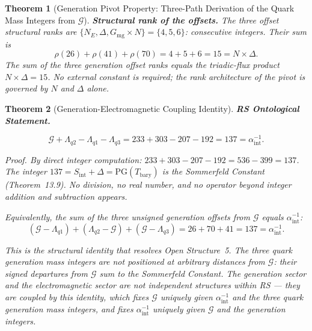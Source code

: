 \documentclass[11pt, letterpaper]{article}
\theoremstyle{definition}
\theoremstyle{plain}
\newtheorem{theorem}{Theorem}[section]
\begin{document}
\begin{theorem}[Generation Pivot Property: Three-Path Derivation of the Quark Mass Integers from $\mathcal{G}$]
\medskip
\noindent\textbf{Structural rank of the offsets.}
The three offset structural ranks are $\{N_E, \Delta, G_\mathrm{mg} \times N\} =
\{4, 5, 6\}$: consecutive integers. Their sum is
\begin{equation}
    \rho(26) + \rho(41) + \rho(70) = 4 + 5 + 6 = 15 = N \times \Delta.
    \label{eq:rank_sum}
\end{equation}
The sum of the three generation offset ranks equals the triadic-flux product $N \times
\Delta = 15$. No external constant is required; the rank architecture of the pivot is
governed by $N$ and $\Delta$ alone.
\end{theorem}

\begin{theorem}[Generation-Electromagnetic Coupling Identity]

\textbf{RS Ontological Statement.}

\begin{equation}
    \mathcal{G} + \Lambda_{q2} - \Lambda_{q1} - \Lambda_{q3}
    = 233 + 303 - 207 - 192 = 137 = \alpha^{-1}_\mathrm{int}.
    \label{eq:gen_em}
\end{equation}

Proof. By direct integer computation: $233 + 303 - 207 - 192 = 536 - 399 = 137$.
The integer $137 = S_\mathrm{int} + \Delta = \mathrm{PG}(T_\mathrm{bary})$ is the
Sommerfeld Constant (Theorem~13.9). No division, no real number, and no
operator beyond integer addition and subtraction appears.

Equivalently, the sum of the three unsigned generation offsets from $\mathcal{G}$
equals $\alpha^{-1}_\mathrm{int}$:
\begin{equation}
    (\mathcal{G} - \Lambda_{q1}) + (\Lambda_{q2} - \mathcal{G}) + (\mathcal{G} - \Lambda_{q3})
    = 26 + 70 + 41 = 137 = \alpha^{-1}_\mathrm{int}.
    \label{eq:gen_em_offsets}
\end{equation}

This is the structural identity that resolves Open Structure~5. The three
quark generation mass integers are not positioned at arbitrary distances from
$\mathcal{G}$: their signed departures from $\mathcal{G}$ sum to the
Sommerfeld Constant. The generation sector and the electromagnetic sector
are not independent structures within RS — they are coupled by this identity,
which fixes $\mathcal{G}$ uniquely given $\alpha^{-1}_\mathrm{int}$ and the three
quark generation mass integers, and fixes $\alpha^{-1}_\mathrm{int}$ uniquely
given $\mathcal{G}$ and the generation integers.


\end{theorem}
\end{document}
